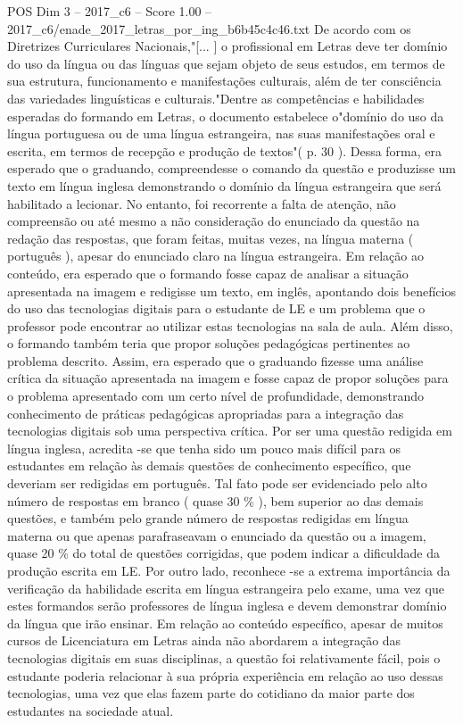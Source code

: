 \begin{textsample}{POS Dim 3 – 2017\_c6 – Score 1.00 – 2017\_c6/enade\_2017\_letras\_por\_ing\_b6b45c4c46.txt}
De acordo com os Diretrizes Curriculares Nacionais,"[... ] o profissional em Letras deve ter domínio do uso da língua ou das línguas que sejam objeto de seus estudos, em termos de sua estrutura, funcionamento e manifestações culturais, além de ter consciência das variedades linguísticas e culturais."Dentre as competências e habilidades esperadas do formando em Letras, o documento estabelece o"domínio do uso da língua portuguesa ou de uma língua estrangeira, nas suas manifestações oral e escrita, em termos de recepção e produção de textos"( p. 30 ).
Dessa forma, era esperado que o graduando, compreendesse o comando da questão e produzisse um texto em língua inglesa demonstrando o domínio da língua estrangeira que será habilitado a lecionar.
No entanto, foi recorrente a falta de atenção, não compreensão ou até mesmo a não consideração do enunciado da questão na redação das respostas, que foram feitas, muitas vezes, na língua materna ( português ), apesar do enunciado claro na língua estrangeira.
Em relação ao conteúdo, era esperado que o formando fosse capaz de analisar a situação apresentada na imagem e redigisse um texto, em inglês, apontando dois benefícios do uso das tecnologias digitais para o estudante de LE e um problema que o professor pode encontrar ao utilizar estas tecnologias na sala de aula.
Além disso, o formando também teria que propor soluções pedagógicas pertinentes ao problema descrito.
Assim, era esperado que o graduando fizesse uma análise crítica da situação apresentada na imagem e fosse capaz de propor soluções para o problema apresentado com um certo nível de profundidade, demonstrando conhecimento de práticas pedagógicas apropriadas para a integração das tecnologias digitais sob uma perspectiva crítica.
Por ser uma questão redigida em língua inglesa, acredita -se que tenha sido um pouco mais difícil para os estudantes em relação às demais questões de conhecimento específico, que deveriam ser redigidas em português.
Tal fato pode ser evidenciado pelo alto número de respostas em branco ( quase 30 \% ), bem superior ao das demais questões, e também pelo grande número de respostas redigidas em língua materna ou que apenas parafraseavam o enunciado da questão ou a imagem, quase 20 \% do total de questões corrigidas, que podem indicar a dificuldade da produção escrita em LE.
Por outro lado, reconhece -se a extrema importância da verificação da habilidade escrita em língua estrangeira pelo exame, uma vez que estes formandos serão professores de língua inglesa e devem demonstrar domínio da língua que irão ensinar.
Em relação ao conteúdo específico, apesar de muitos cursos de Licenciatura em Letras ainda não abordarem a integração das tecnologias digitais em suas disciplinas, a questão foi relativamente fácil, pois o estudante poderia relacionar à sua própria experiência em relação ao uso dessas tecnologias, uma vez que elas fazem parte do cotidiano da maior parte dos estudantes na sociedade atual.

\end{textsample}
